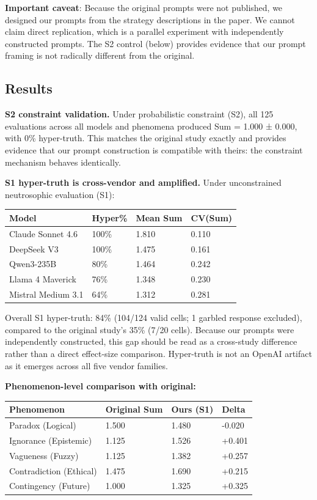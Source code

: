 \textbf{Important caveat}: Because the original prompts were not
published, we designed our prompts from the strategy descriptions in the
paper. We cannot claim direct replication, which is a parallel
experiment with independently constructed prompts. The S2 control
(below) provides evidence that our prompt framing is not radically
different from the original.

\subsection{Results}

\textbf{S2 constraint validation.} Under probabilistic constraint (S2),
all 125 evaluations across all models and phenomena produced Sum = 1.000
± 0.000, with 0\% hyper-truth. This matches the original study exactly
and provides evidence that our prompt construction is compatible with
theirs: the constraint mechanism behaves identically.

\textbf{S1 hyper-truth is cross-vendor and amplified.} Under
unconstrained neutrosophic evaluation (S1):

\begin{longtable}[]{@{}llll@{}}
\toprule\noalign{}
Model & Hyper\% & Mean Sum & CV(Sum) \\
\midrule\noalign{}
\endhead
\bottomrule\noalign{}
\endlastfoot
Claude Sonnet 4.6 & 100\% & 1.810 & 0.110 \\
DeepSeek V3 & 100\% & 1.475 & 0.161 \\
Qwen3-235B & 80\% & 1.464 & 0.242 \\
Llama 4 Maverick & 76\% & 1.348 & 0.230 \\
Mistral Medium 3.1 & 64\% & 1.312 & 0.281 \\
\end{longtable}

Overall S1 hyper-truth: 84\% (104/124 valid cells; 1 garbled response
excluded), compared to the original study's 35\% (7/20 cells). Because
our prompts were independently constructed, this gap should be read as a
cross-study difference rather than a direct effect-size comparison.
Hyper-truth is not an OpenAI artifact as it emerges across all five
vendor families.

\textbf{Phenomenon-level comparison with original:}

\begin{longtable}[]{@{}llll@{}}
\toprule\noalign{}
Phenomenon & Original Sum & Ours (S1) & Delta \\
\midrule\noalign{}
\endhead
\bottomrule\noalign{}
\endlastfoot
Paradox (Logical) & 1.500 & 1.480 & -0.020 \\
Ignorance (Epistemic) & 1.125 & 1.526 & +0.401 \\
Vagueness (Fuzzy) & 1.125 & 1.382 & +0.257 \\
Contradiction (Ethical) & 1.475 & 1.690 & +0.215 \\
Contingency (Future) & 1.000 & 1.325 & +0.325 \\
\end{longtable}

